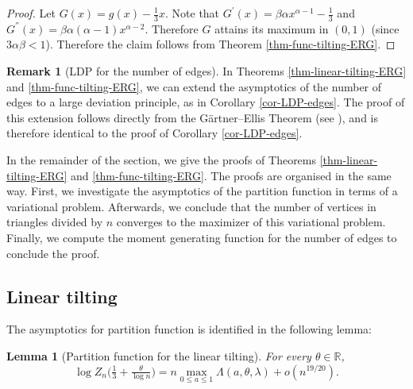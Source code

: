 \documentclass[bj,authoryear,noshowframe]{imsart}
\numberwithin{equation}{section}
\theoremstyle{plain}
\newtheorem{lem}[thm]{Lemma}
\theoremstyle{definition}
\newtheorem{rmk}[thm]{Remark}
\begin{document}
\begin{proof}
Let $G(x)= g(x)-\tfrac13 x$. Note that $G^{'}(x)= \beta \alpha x^{\alpha -1} -\frac{1}{3}$ and $G^{''}(x)= \beta \alpha (\alpha-1) x^{\alpha -2} $. Therefore $G$ attains its maximum in $(0,1)$ (since $3\alpha \beta <1$). Therefore the claim follows from Theorem \ref{thm-func-tilting-ERG}.
\end{proof}

\begin{rmk}[LDP for the number of edges]
\label{rem-LDP-edges}
{\rm In Theorems \ref{thm-linear-tilting-ERG} and \ref{thm-func-tilting-ERG}, we can extend the asymptotics of the number of edges to a large deviation principle, as in Corollary \ref{cor-LDP-edges}. The proof of this extension follows directly from the G\"artner--Ellis Theorem (see \cite[Theorem 2.3.6]{DemZei98}), and is therefore identical to the proof of Corollary \ref{cor-LDP-edges}.}
\end{rmk}

In the remainder of the section, we give the proofs of Theorems \ref{thm-linear-tilting-ERG} and \ref{thm-func-tilting-ERG}. The proofs are organised in the same way. First, we investigate the asymptotics of the partition function in terms of a variational problem. Afterwards, we conclude that the number of vertices in triangles divided by $n$ converges to the maximizer of this variational problem. Finally, we compute the moment generating function for the number of edges to conclude the proof.


\subsection{Linear tilting}
\label{sec:exptriangles1}

The asymptotics for partition function is identified in the following lemma:

\begin{lem}[Partition function for the linear tilting]
For every $\theta \in \mathbb{R}$,
	\begin{equation}
	\label{eqn:satoct71210pm}
	  \log Z_n\big(\tfrac{1}{3}+\tfrac{\theta}{\log{n}}\big) 
	 = n\max_{0 \leq a \leq 1} \Lambda(a,\theta,\lambda) +o(n^{19/20}).
	\end{equation}
\end{lem}
\end{document}
